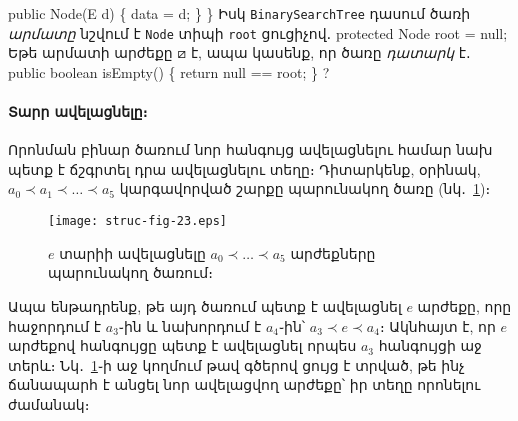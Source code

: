   public Node(E d)
  \{
    data = d;
  \}
\}
\nwendcode{}\nwdocspar
Իսկ \texttt{BinarySearchTree} դասում ծառի \emph{արմատը} նշվում 
է \texttt{Node} տիպի \texttt{root} ցուցիչով․
\nwenddocs{}\endmoddef{}
protected Node root = null; 
\nwendcode{}\nwdocspar
Եթե արմատի արժեքը \(\boxslash\) է, ապա կասենք, որ ծառը \emph{դատարկ} է․
\nwenddocs{}\endmoddef{}
public boolean isEmpty()
\{
  return null == root;
\}
\nwendcode{}\nwdocspar
?

%
\paragraph{Տարր ավելացնելը։}
Որոնման բինար ծառում նոր հանգույց ավելացնելու համար նախ 
պետք է ճշգրտել դրա ավելացնելու տեղը։ Դիտարկենք, օրինակ, 
\(a_0\prec a_1\prec\ldots\prec a_5\) կարգավորված շարքը
պարունակող ծառը (նկ․~\ref{fig:bst-3})։
\begin{figure}[h]
\centering
\texttt{[image: struc-fig-23.eps]}
\caption{\(e\) տարիի ավելացնելը \(a_0\prec\ldots\prec a_5\)
արժեքները պարունակող ծառում։}
\label{fig:bst-3}
\end{figure}
Ապա ենթադրենք, թե այդ ծառում պետք է ավելացնել \(e\) 
արժեքը, որը հաջորդում է \(a_3\)֊ին և նախորդում է 
\(a_4\)֊ին՝ \(a_3\prec e\prec a_4\)։ Ակնհայտ է, որ 
\(e\) արժեքով հանգույցը պետք է ավելացնել որպես \(a_3\)
հանգույցի աջ տերև։ Նկ․~\ref{fig:bst-3}֊ի աջ կողմում թավ 
գծերով ցույց է տրված, թե ինչ ճանապարհ է անցել նոր 
ավելացվող արժեքը՝ իր տեղը որոնելու ժամանակ։

